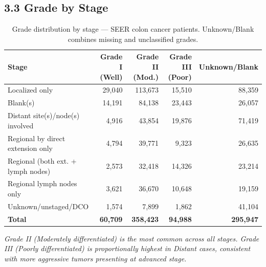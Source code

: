 \documentclass[11pt, a4paper]{article}
\begin{document}
\vspace{6pt}

\subsection*{3.3 Grade by Stage}

\begin{table}[H]
\centering
\renewcommand{\arraystretch}{1.3}
\begin{tabular}{lrrrr}
\toprule
\textbf{Stage} & \textbf{Grade I (Well)} & \textbf{Grade II (Mod.)} & \textbf{Grade III (Poor)} & \textbf{Unknown/Blank} \\
\midrule
Localized only                                               & 29,040 & 113,673 & 15,510 &  88,359 \\
Blank(s)                                                     & 14,191 &  84,138 & 23,443 &  26,057 \\
Distant site(s)/node(s) involved                             &  4,916 &  43,854 & 19,876 &  71,419 \\
Regional by direct extension only                            &  4,794 &  39,771 &  9,323 &  26,635 \\
Regional (both ext. + lymph nodes)                           &  2,573 &  32,418 & 14,326 &  23,214 \\
Regional lymph nodes only                                    &  3,621 &  36,670 & 10,648 &  19,159 \\
Unknown/unstaged/DCO                                         &  1,574 &   7,899 &  1,862 &  41,104 \\
\midrule
\textbf{Total}                                               & \textbf{60,709} & \textbf{358,423} & \textbf{94,988} & \textbf{295,947} \\
\bottomrule
\end{tabular}
\caption{Grade distribution by stage --- SEER colon cancer patients. Unknown/Blank combines missing and unclassified grades.}
\end{table}

\noindent\textit{Grade II (Moderately differentiated) is the most common across all stages. Grade III (Poorly differentiated) is proportionally highest in Distant cases, consistent with more aggressive tumors presenting at advanced stage.}

\vspace{6pt}

\end{document}
